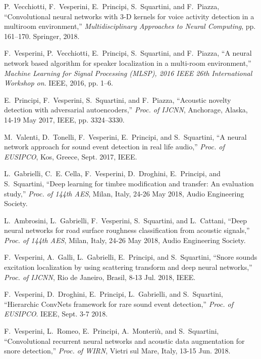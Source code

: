 \begin{list}{[]~}{}
\item
P.~Vecchiotti, F.~Vesperini, E.~Principi, S.~Squartini, and F.~Piazza, ``Convolutional neural networks with 3-{D} kernels for voice activity detection in a multiroom environment,'' \emph{Multidisciplinary Approaches to Neural Computing}, pp. 161--170. Springer, 2018.

\item
F.~Vesperini, P.~Vecchiotti, E.~Principi, S.~Squartini, and F.~Piazza, ``A neural network based algorithm for speaker localization in a multi-room environment,'' \emph{Machine Learning for Signal Processing (MLSP), 2016 IEEE 26th International Workshop on}. IEEE, 2016, pp. 1--6.

\item
E.~Principi, F.~Vesperini, S.~Squartini, and F.~Piazza, ``Acoustic novelty detection with adversarial autoencoders,'' \emph{Proc. of IJCNN}, Anchorage, Alaska, 14-19 May 2017, IEEE, pp. 3324--3330.

\item
M.~Valenti, D.~Tonelli, F.~Vesperini, E.~Principi, and S.~Squartini, ``A neural network approach for sound event detection in real life audio,'' \emph{Proc. of EUSIPCO}, Kos, Greece, Sept. 2017, IEEE.

\item
L.~Gabrielli, C.~E. Cella, F.~Vesperini, D.~Droghini, E.~Principi, and S.~Squartini, ``Deep learning for timbre modification and transfer: An evaluation study,'' \emph{Proc. of 144th AES}, Milan, Italy, 24-26 May 2018, Audio Engineering Society.

\item
L.~Ambrosini, L.~Gabrielli, F.~Vesperini, S.~Squartini, and L.~Cattani, ``Deep neural networks for road surface roughness classification from acoustic signals,'' \emph{Proc. of 144th AES}, Milan, Italy, 24-26 May 2018, Audio Engineering Society.

\item
F.~Vesperini, A.~Galli, L.~Gabrielli, E.~Principi, and S.~Squartini, ``Snore sounds excitation localization by using scattering transform and deep neural networks,'' \emph{Proc. of IJCNN}, Rio de Janeiro, Brasil, 8-13 Jul. 2018, IEEE.

\item
F.~Vesperini, D.~Droghini, E.~Principi, L.~Gabrielli, and S.~Squartini, ``Hierarchic {C}onv{N}ets framework for rare sound event detection,'' \emph{Proc. of EUSIPCO}. IEEE, Sept. 3-7 2018.

\item
F.~Vesperini, L.~Romeo, E.~Principi, A.~Monteri\`{u}, and S.~Squartini, ``Convolutional recurrent neural networks and acoustic data augmentation for snore detection,'' \emph{Proc. of WIRN}, Vietri sul Mare, Italy, 13-15 Jun. 2018.


\end{list}
